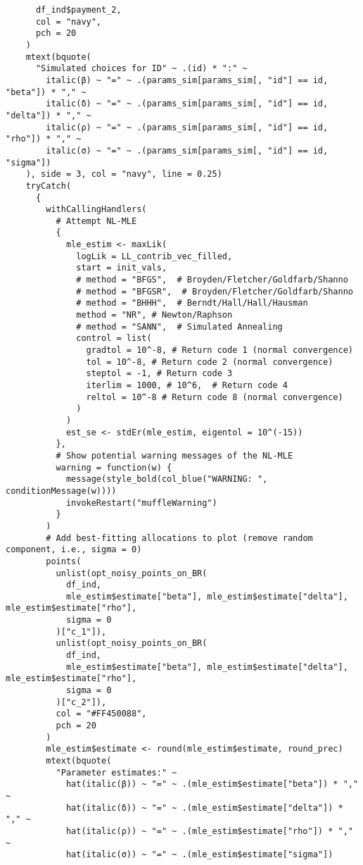 \documentclass[12pt, a4paper, oneside]{article}
\theoremstyle{Plain}
\theoremstyle{Definition}
\theoremstyle{Remark}
\begin{document}
\begin{appendix}
\begin{lstlisting}
      df_ind$payment_2,
      col = "navy",
      pch = 20
    )
    mtext(bquote(
      "Simulated choices for ID" ~ .(id) * ":" ~
        italic(β) ~ "=" ~ .(params_sim[params_sim[, "id"] == id, "beta"]) * "," ~
        italic(δ) ~ "=" ~ .(params_sim[params_sim[, "id"] == id, "delta"]) * "," ~
        italic(ρ) ~ "=" ~ .(params_sim[params_sim[, "id"] == id, "rho"]) * "," ~
        italic(σ) ~ "=" ~ .(params_sim[params_sim[, "id"] == id, "sigma"])
    ), side = 3, col = "navy", line = 0.25)
    tryCatch(
      {
        withCallingHandlers(
          # Attempt NL-MLE
          {
            mle_estim <- maxLik(
              logLik = LL_contrib_vec_filled,
              start = init_vals,
              # method = "BFGS",  # Broyden/Fletcher/Goldfarb/Shanno
              # method = "BFGSR",  # Broyden/Fletcher/Goldfarb/Shanno
              # method = "BHHH",  # Berndt/Hall/Hall/Hausman
              method = "NR", # Newton/Raphson
              # method = "SANN",  # Simulated Annealing
              control = list(
                gradtol = 10^-8, # Return code 1 (normal convergence)
                tol = 10^-8, # Return code 2 (normal convergence)
                steptol = -1, # Return code 3
                iterlim = 1000, # 10^6,  # Return code 4
                reltol = 10^-8 # Return code 8 (normal convergence)
              )
            )
            est_se <- stdEr(mle_estim, eigentol = 10^(-15))
          },
          # Show potential warning messages of the NL-MLE
          warning = function(w) {
            message(style_bold(col_blue("WARNING: ", conditionMessage(w))))
            invokeRestart("muffleWarning")
          }
        )
        # Add best-fitting allocations to plot (remove random component, i.e., sigma = 0)
        points(
          unlist(opt_noisy_points_on_BR(
            df_ind,
            mle_estim$estimate["beta"], mle_estim$estimate["delta"], mle_estim$estimate["rho"],
            sigma = 0
          )["c_1"]),
          unlist(opt_noisy_points_on_BR(
            df_ind,
            mle_estim$estimate["beta"], mle_estim$estimate["delta"], mle_estim$estimate["rho"],
            sigma = 0
          )["c_2"]),
          col = "#FF450088",
          pch = 20
        )
        mle_estim$estimate <- round(mle_estim$estimate, round_prec)
        mtext(bquote(
          "Parameter estimates:" ~
            hat(italic(β)) ~ "=" ~ .(mle_estim$estimate["beta"]) * "," ~
            hat(italic(δ)) ~ "=" ~ .(mle_estim$estimate["delta"]) * "," ~
            hat(italic(ρ)) ~ "=" ~ .(mle_estim$estimate["rho"]) * "," ~
            hat(italic(σ)) ~ "=" ~ .(mle_estim$estimate["sigma"])

\end{lstlisting}
\end{appendix}
\end{document}
